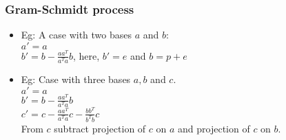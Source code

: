 \subsubsection{Gram-Schmidt process}
\begin{itemize}
	

\item Eg: A case with two bases $a$ and $b$:\\
$a' = a$\\
$b'= b - \frac{aa^T}{a^Ta}b$, here, $b'= e$ and $b = p + e$\\

\item Eg: Case with three bases $a, b$ and $c$.\\

$a' = a$\\
$b' = b - \frac{aa^T}{a^Ta}b$\\
$c' = c - \frac{aa^T}{a^Ta}c - \frac{bb^T}{b^Tb}c$\\
From $c$ subtract projection of $c$ on $a$ and projection of $c$ on $b$.

\end{itemize}
